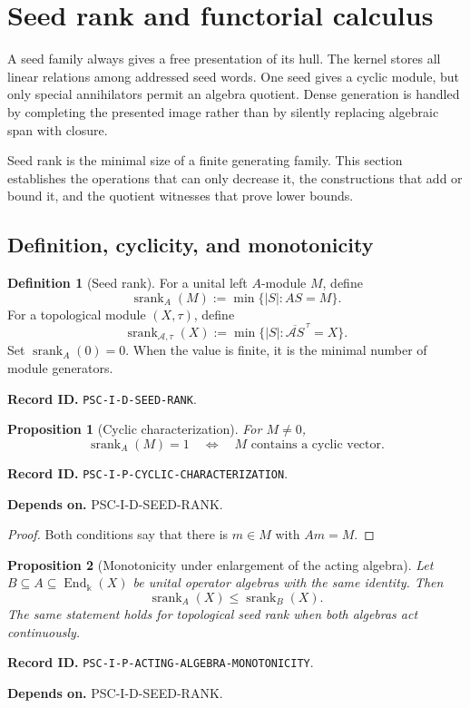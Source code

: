\documentclass[11pt]{article}
\newtheorem{proposition}[proposition]{Proposition}
\theoremstyle{definition}
\newtheorem{definition}[definition]{Definition}
\theoremstyle{remark}
\newcommand{\bbk}{\Bbbk}
\newcommand{\A}{\mathcal A}
\newcommand{\srank}{\operatorname{srank}}
\newcommand{\End}{\operatorname{End}}
\newcommand{\cl}[1]{\overline{#1}}
\newcommand{\RecordID}[1]{\par\smallskip\noindent\begingroup\footnotesize\color{PSCGray}\raggedright\textbf{Record ID.} \nolinkurl{#1}.\par\endgroup}
\newcommand{\Depends}[1]{\par\noindent\begingroup\footnotesize\color{PSCGray}\raggedright\textbf{Depends on.} #1\par\endgroup}
\begin{document}
\section{Seed rank and functorial calculus}

\begin{sectionrecap}
A seed family always gives a free presentation of its hull.  The kernel stores all linear relations among addressed seed words.  One seed gives a cyclic module, but only special annihilators permit an algebra quotient.  Dense generation is handled by completing the presented image rather than by silently replacing algebraic span with closure.
\end{sectionrecap}

\begin{readerroadmap}
Seed rank is the minimal size of a finite generating family.  This section establishes the operations that can only decrease it, the constructions that add or bound it, and the quotient witnesses that prove lower bounds.
\end{readerroadmap}
\subsection{Definition, cyclicity, and monotonicity}

\begin{definition}[Seed rank]
\label{def:seed-rank}
For a unital left $A$-module $M$, define
\[
\srank_A(M):=\min\{|S|:AS=M\}.
\]
For a topological module $(X,\tau)$, define
\[
\srank_{\A,\tau}(X):=\min\{|S|:\cl{\A S}^{\,\tau}=X\}.
\]
Set $\srank_A(0)=0$.  When the value is finite, it is the minimal number of module generators.
\end{definition}
\RecordID{PSC-I-D-SEED-RANK}

\begin{proposition}[Cyclic characterization]
\label{prop:cyclic-characterization}
For $M\neq0$,
\[
\srank_A(M)=1
\quad\Longleftrightarrow\quad
M\text{ contains a cyclic vector}.
\]
\end{proposition}
\RecordID{PSC-I-P-CYCLIC-CHARACTERIZATION}
\Depends{PSC-I-D-SEED-RANK.}

\begin{proof}
Both conditions say that there is $m\in M$ with $Am=M$.
\end{proof}

\begin{proposition}[Monotonicity under enlargement of the acting algebra]
\label{prop:acting-algebra-monotonicity}
Let $B\subseteq A\subseteq\End_{\bbk}(X)$ be unital operator algebras with the same identity.  Then
\[
\boxed{\srank_A(X)\leq\srank_B(X).}
\]
The same statement holds for topological seed rank when both algebras act continuously.
\end{proposition}
\RecordID{PSC-I-P-ACTING-ALGEBRA-MONOTONICITY}
\Depends{PSC-I-D-SEED-RANK.}
\end{document}

